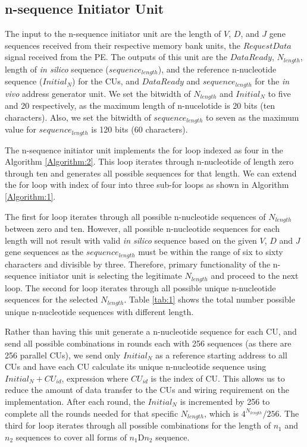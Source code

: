 \subsection{n-sequence Initiator Unit }\label{subsec:nsequence}
The input to the n-sequence initiator unit are the length of $V$, $D$, and $J$ gene sequences received from their respective memory bank units, the $Request Data$ signal received from the PE. The outputs of this unit are the $Data Ready$, $N_{length}$, length of \emph{in silico} sequence ($sequence_{length}$), and the reference n-nucleotide sequence ($Initial_N$) for the CUs, and $Data Ready$ and $sequence_{length}$ for the \emph{in vivo} address generator unit. We set the bitwidth of $N_{length}$ and $Initial_N$ to five and 20 respectively, as the maximum length of n-nucelotide is 20 bits (ten characters). Also, we set the bitwidth of $sequence_{length}$ to seven as the maximum value for $sequence_{length}$ is 120 bits (60 characters).  

The n-sequence initiator unit implements the for loop indexed  as four in the Algorithm \ref{Algorithm:2}. This loop iterates through n-nucleotide of length zero through ten and generates all possible sequences for that length. We can extend the for loop with index of four into three sub-for loops as shown in Algorithm \ref{Algorithm:1}. 

The first for loop iterates through all possible n-nucleotide sequences of $N_{length}$ between zero and ten. However, all possible n-nucleotide sequences for each length will not result with valid \emph{in silico} sequence based on the given $V$, $D$ and $J$ gene sequences as the $sequence_{length}$ must be within the range of six to sixty characters and divisible by three. Therefore, primary functionality of the n-sequence initiator unit is selecting the legitimate $N_{length}$ and proceed to the next loop. The second for loop iterates through all possible unique n-nucleotide sequences for the selected $N_{length}$. Table \ref{tab:1} shows the total number possible unique n-nucleotide sequences with different length. 

Rather than having this unit generate a n-nucleotide sequence for each CU, and send all possible combinations in rounds each with 256 sequences (as there are 256 parallel CUs), we send only $Initial_N$ as a reference starting address to all CUs and have each CU calculate its unique n-nucleotide sequence using $Initial_N + CU_{id}$, expression where $CU_{id}$ is the index of CU. This allows us to reduce the amount of data transfer to the CUs and wiring requirement on the implementation. After each round, the $Initial_N$ is incremented by 256 to complete all the rounds needed for that specific $N_{length}$, which is  $4^{N_{length}}/256$. The third for loop iterates through all possible combinations for the length of  $n_1$ and $n_2$ sequences to cover all forms of $n_1$D$n_2$ sequence. 

